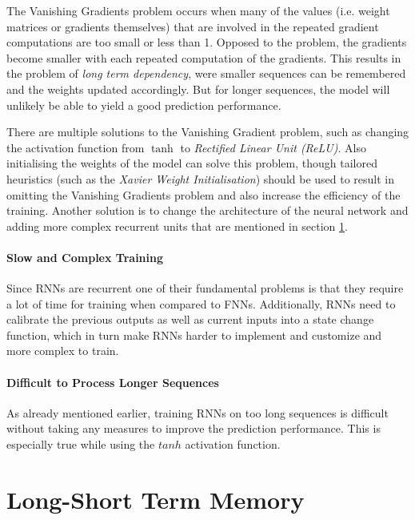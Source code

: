                 The Vanishing Gradients problem occurs when many of the values (i.e. weight matrices or gradients themselves) that are involved in the repeated gradient computations are too small or less than 1. Opposed to the  problem, the gradients become smaller with each repeated computation of the gradients.
                This results in the problem of \emph{long term dependency}, were smaller sequences can be remembered and the weights updated accordingly. But for longer sequences, the model will unlikely be able to yield a good prediction performance.

                There are multiple solutions to the Vanishing Gradient problem, such as changing the activation function from $\tanh$ to \emph{Rectified Linear Unit (ReLU)}. Also initialising the weights of the model can solve this problem, though tailored heuristics (such as the \emph{Xavier Weight Initialisation}) should be used to result in omitting the Vanishing Gradients problem and also increase the efficiency of the training. Another solution is to change the architecture of the neural network and adding more complex recurrent units that are mentioned in section \ref{sec:lstm-background}.

            \paragraph{Slow and Complex Training}

                Since RNNs are recurrent one of their fundamental problems is that they require a lot of time for training when compared to FNNs. Additionally, RNNs need to calibrate the previous outputs as well as current inputs into a state change function, which in turn make RNNs harder to implement and customize and more complex to train.

            \paragraph{Difficult to Process Longer Sequences}

                As already mentioned earlier, training RNNs on too long sequences is difficult without taking any measures to improve the prediction performance. This is especially true while using the $tanh$ activation function. 
                

    \section{Long-Short Term Memory}
    \label{sec:lstm-background}

